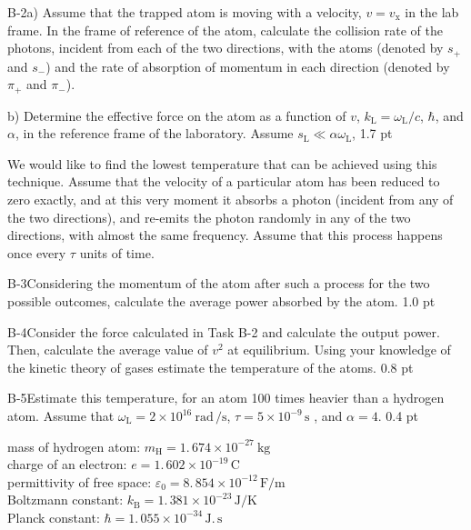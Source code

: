 B-2\quad a) Assume that the trapped atom is moving with a velocity,
$v = v_\mathrm{x}$ in the lab frame. In the frame of reference of the atom,
calculate the collision rate of the photons, incident from each of the two
directions, with the atoms (denoted by $s_+$ and $s_-$) and the rate of
absorption of momentum in each direction (denoted by $\pi_+$ and $\pi_-$).

b) Determine the effective force on the atom as a function of $v$,
$k_\mathrm{L} = \omega_\mathrm{L}/c$, $\hbar$, and $\alpha$, in the reference
frame of the laboratory. Assume $s_\mathrm{L} \ll \alpha\omega_\mathrm{L}$,
\hfill 1.7 pt

We would like to find the lowest temperature that can be achieved using this
technique. Assume that the velocity of a particular atom has been reduced to
zero exactly, and at this very moment it absorbs a photon (incident from any of
the two directions), and re-emits the photon randomly in any of the two
directions, with almost the same frequency. Assume that this process happens
once every $\tau$ units of time.

B-3\quad Considering the momentum of the atom after such a process for the two
possible outcomes, calculate the average power absorbed by the atom.
\hfill 1.0 pt

B-4\quad Consider the force calculated in Task B-2 and calculate the output
power. Then, calculate the average value of $v^2$ at equilibrium. Using your
knowledge of the kinetic theory of gases estimate the temperature of the atoms.
\hfill 0.8 pt

B-5\quad Estimate this temperature, for an atom 100 times heavier than a
hydrogen atom. Assume that
$\omega_\mathrm{L} = 2 \times 10^{16}\ \mathrm{rad\,/s}$,
$\tau = 5 \times 10^{-9}\,\mathrm{s}$ , and $\alpha = 4$. \hfill 0.4 pt

\begin{center}
mass of hydrogen atom: $m_\mathrm{H} = 1.\,674 \times 10^{-27}\ \mathrm{kg}$\\
charge of an electron: $e = 1.\,602 \times 10^{-19}\,\mathrm{C}$\\
permittivity of free space: $\varepsilon_0 = 8.\,854 \times 10^{-12}\,\mathrm{F/m}$\\
Boltzmann constant: $k_\mathrm{B} = 1.\,381 \times 10^{-23}\,\mathrm{J/K}$\\
Planck constant: $\hbar = 1.\,055 \times 10^{-34}\,\mathrm{J.\,s}$
\end{center}

